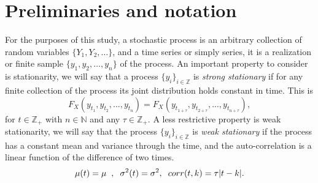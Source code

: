 \section{Preliminaries and notation}
For the purposes of this study, a stochastic process is an arbitrary collection of random variables $\{Y_1, Y_2, \ldots \}$, and a time series or simply series, it is a realization or finite sample $\{y_1, y_2 , \ldots, y_n \}$ of the process. An important property to consider is stationarity, we will say that a process $\{y_i \}_{i \in \mathbb{Z}}$ is \textit{strong stationary} if for any finite collection of the process its joint distribution holds constant in time. This is
%
$$
F_X(y_{t_1},y_{t_2},...,y_{t_n})=F_X(y_{t_{1+\tau}},y_{t_{2+\tau}},...,y_{t_{n+\tau}}),
$$
%
for $t \in \mathbb{Z}_+$ with $n \in \mathbb{N}$ and any $\tau \in \mathbb {Z}_+$. A less restrictive property is weak stationarity, we will say that the process $\{y_i \}_{i \in \mathbb{Z}}$ is \textit{weak stationary} if the process has a constant mean and variance through the time, and the auto-correlation is a linear function of the difference of two times.
%
$$
\mu(t)=\mu \hspace{0.2cm},\hspace{0.2cm} \sigma^2(t)=\sigma^2,\hspace{0.2cm} corr(t,k) = \tau |t - k|.
$$
%
